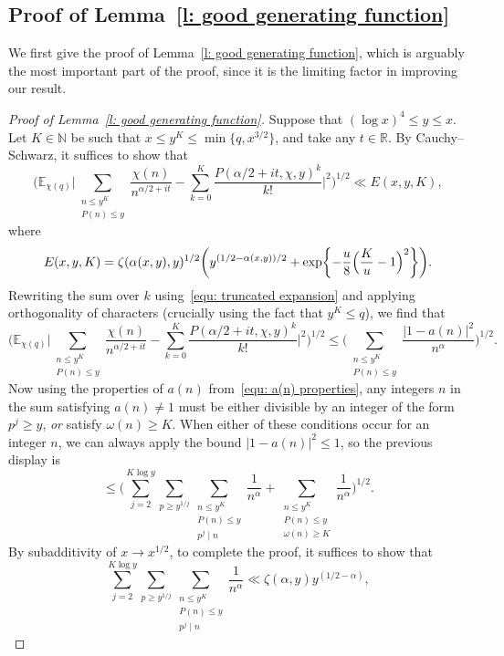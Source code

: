 \documentclass[a4paper,12pt,reqno]{amsart}
\newcommand{\N}{\mathbb{N}}
\newcommand{\R}{\mathbb{R}}
\newcommand{\E}{\mathbb{E}}
\begin{document}
\subsection{Proof of Lemma~\ref{l: good generating function}}
We first give the proof of Lemma~\ref{l: good generating function}, which is arguably the most important part of the proof, since it is the limiting factor in improving our result.
\begin{proof}[Proof of Lemma~\ref{l: good generating function}]
Suppose that $(\log x)^4 \leq y \leq x$. Let $K \in \N$ be such that $x \leq y^K \leq \min \{ q, x^{3/2} \}$, and take any $t \in \R$. By Cauchy--Schwarz, it suffices to show that
\[
\biggl( \E_{\chi (q)} \biggl| \sum_{\substack{n \leq y^K \\ P(n) \leq y}} \frac{\chi(n)}{n^{\alpha / 2 + it}} - \sum_{k = 0}^{K} \frac{P (\alpha / 2 + it, \chi, y)^{k}}{k!} \biggr|^2 \biggr)^{1/2} \ll E (x, y, K),
\]
where
\[
E (x, y, K) = \zeta (\alpha(x,y), y)^{1/2} \biggl(y^{(1/2 - \alpha(x,y))/2} + \exp \biggl\{ - \frac{u}{8} \Bigl( \frac{K}{u} -1 \Bigr)^2 \biggr\} \biggr).
\]
Rewriting the sum over $k$ using~\eqref{equ: truncated expansion} and applying orthogonality of characters (crucially using the fact that $y^K \leq q$), we find that
\[
\biggl( \E_{\chi (q)} \biggl| \sum_{\substack{n \leq y^K \\ P(n) \leq y}} \frac{\chi(n)}{n^{\alpha / 2 + it}} - \sum_{k = 0}^{K} \frac{P (\alpha / 2 + it, \chi, y)^{k}}{k!} \biggr|^2 \biggr)^{1/2} \leq \biggl( \sum_{\substack{n \leq y^K \\ P(n) \leq y}} \frac{|1 - a(n)|^2}{n^{\alpha}} \biggr)^{1/2} .
\]
Now using the properties of $a(n)$ from~\eqref{equ: a(n) properties}, any integers $n$ in the sum satisfying $a(n) \neq 1$ must be either divisible by an integer of the form $p^j \geq y$, \emph{or} satisfy $\omega (n) \geq K$. When either of these conditions occur for an integer $n$, we can always apply the bound $|1 - a(n)|^2 \leq 1$, so the previous display is
\[
\leq \biggl( \sum_{j=2}^{K \log y} \sum_{p \geq y^{1/j}} \sum_{\substack{n \leq y^K \\ P(n) \leq y \\ p^j \mid n}} \frac{1}{n^{\alpha}} + \sum_{\substack{n \leq y^K \\ P(n) \leq y \\ \omega(n) \geq K}} \frac{1}{n^{\alpha}} \biggr)^{1/2}.
\]
By subadditivity of $x \rightarrow x^{1/2}$, to complete the proof, it suffices to show that
\[
\sum_{j=2}^{K \log y} \sum_{p \geq y^{1/j}} \sum_{\substack{n \leq y^K \\ P(n) \leq y \\ p^j \mid n}} \frac{1}{n^{\alpha}} \ll \zeta (\alpha, y) y^{(1/2 - \alpha)} ,
\]
\end{proof}
\end{document}
